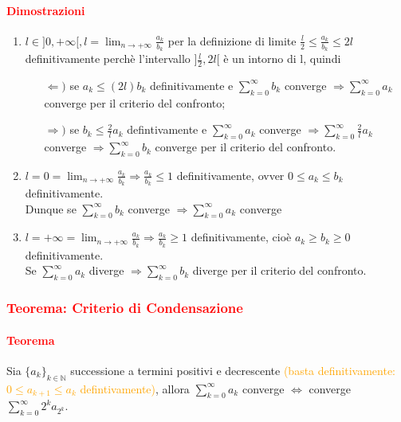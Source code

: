 \documentclass{article}
\newcommand{\N}{\mathbb{N}}
\begin{document}
\paragraph{\textcolor{red}{Dimostrazioni}}
\begin{enumerate}
    \item $l\in ]0,+\infty[,l=\lim_{n \rightarrow + \infty} \frac{a_k}{b_k}$ per la definizione di limite $\frac{l}{2}\leq\frac{a_k}{b_k} \leq 2l$ definitivamente perchè l'intervallo $]\frac{l}{2},2l[$ è un intorno di l, quindi
    \begin{itemize}
        \item[$\Leftarrow)$] se $a_k\leq (2l)b_k$ definitivamente e $\sum_{k=0}^{\infty} b_k$ converge $\Rightarrow \sum_{k=0}^{\infty} a_k$ converge per il criterio del confronto;
        \item[$\Rightarrow)$] se $b_k \leq \frac{2}{l} a_k$ defintivamente e $\sum_{k=0}^{\infty} a_k$ converge $\Rightarrow \sum_{k=0}^{\infty} \frac{2}{l} a_k$ converge $\Rightarrow \sum_{k=0}^{\infty} b_k$ converge per il criterio del confronto.
    \end{itemize}
    \item $l=0=\lim_{n \rightarrow +\infty} \frac{a_k}{b_k} \Rightarrow \frac{a_k}{b_k} \leq 1$ definitivamente, ovver $0\leq a_k \leq b_k $ definitivamente. \\
    Dunque se $\sum_{k=0}^{\infty} b_k $ converge $\Rightarrow \sum_{k=0}^{\infty} a_k $ converge
    \item $l=+\infty = \lim_{n \rightarrow +\infty} \frac{a_k}{b_k} \Rightarrow \frac{a_k}{b_k} \geq 1$ definitivamente, cioè $a_k \geq b_k \geq 0$ definitivamente.
    \\Se $\sum_{k=0}^{\infty} a_k$ diverge $ \Rightarrow \sum_{k=0}^{\infty} b_k$ diverge per il criterio del confronto.
\end{enumerate}
\begin{flushright}
\large\Lightning
\end{flushright}

\subsubsection{\textcolor{red}{Teorema: Criterio di Condensazione}}
\paragraph{\textcolor{red}{Teorema}}
Sia $ \{a_k\}_{k \in \N}$ successione a termini positivi e decrescente \textcolor{orange}{(basta definitivamente: $0 \leq a_{k+1} \leq a_k$ defintivamente)}, allora $\sum_{k=0}^{\infty} a_k$ converge $\Leftrightarrow$ converge $\sum_{k=0}^{\infty} 2^k a_{2^k}$.
\end{document}
